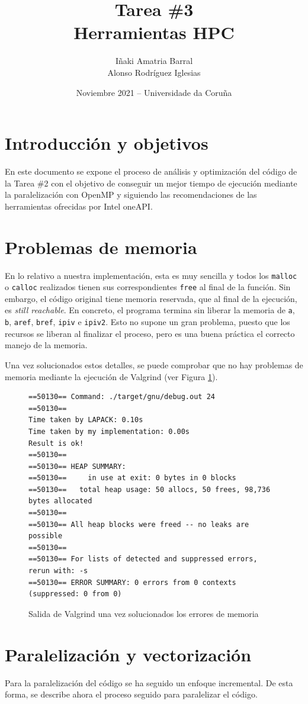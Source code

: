 \documentclass[12pt]{article}
\title{Tarea \#3\\ Herramientas HPC}
\author{Iñaki Amatria Barral\\ Alonso Rodríguez Iglesias}
\date{Noviembre 2021 -- Universidade da Coruña}
\begin{document}
\maketitle
\section{Introducción y objetivos}
En este documento se expone el proceso de análisis y optimización del código de la Tarea \#2 con el objetivo de conseguir un mejor tiempo de ejecución mediante la paralelización con OpenMP y siguiendo las recomendaciones de las herramientas ofrecidas por Intel oneAPI.
\section{Problemas de memoria}
En lo relativo a nuestra implementación, esta es muy sencilla y todos los \texttt{malloc} o \texttt{calloc} realizados tienen sus correspondientes \texttt{free} al final de la función. Sin embargo, el código original tiene memoria reservada, que al final de la ejecución, es \textit{still reachable}. En concreto, el programa termina sin liberar la memoria de \texttt{a}, \texttt{b}, \texttt{aref}, \texttt{bref}, \texttt{ipiv} e \texttt{ipiv2}. Esto no supone un gran problema, puesto que los recursos se liberan al finalizar el proceso, pero es una buena práctica el correcto manejo de la memoria.

Una vez solucionados estos detalles, se puede comprobar que no hay problemas de memoria mediante la ejecución de Valgrind (ver Figura \ref{fig:val}).

\begin{figure}
\centering
\begin{verbatim}
==50130== Command: ./target/gnu/debug.out 24
==50130== 
Time taken by LAPACK: 0.10s
Time taken by my implementation: 0.00s
Result is ok!
==50130== 
==50130== HEAP SUMMARY:
==50130==     in use at exit: 0 bytes in 0 blocks
==50130==   total heap usage: 50 allocs, 50 frees, 98,736 bytes allocated
==50130== 
==50130== All heap blocks were freed -- no leaks are possible
==50130== 
==50130== For lists of detected and suppressed errors, rerun with: -s
==50130== ERROR SUMMARY: 0 errors from 0 contexts (suppressed: 0 from 0)
\end{verbatim}
\caption{Salida de Valgrind una vez solucionados los errores de memoria}
\label{fig:val}
\end{figure}
\section{Paralelización y vectorización}
Para la paralelización del código se ha seguido un enfoque incremental. De esta forma, se describe ahora el proceso seguido para paralelizar el código.
\end{document}
